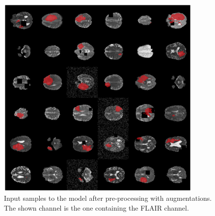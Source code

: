 \documentclass[fleqn,10pt]{SelfArx} %
\begin{document}
\begin{figure}[!t]
    \centering
    \includegraphics[width=0.9\textwidth]{report/Images/train_samples.png}
    \caption{Input samples to the model after pre-processing with augmentations. The shown channel is the one containing the FLAIR channel.}
    \label{fig:input_samples}
\end{figure}
\end{document}
